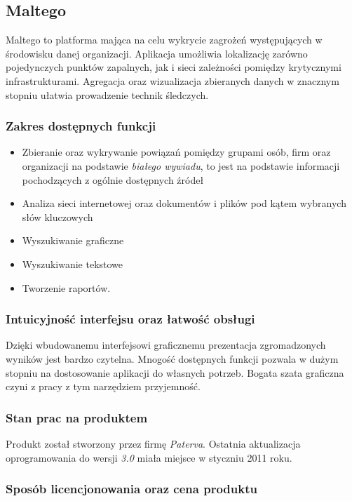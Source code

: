 \documentclass[11pt,a4paper]{article}
\begin{document}
\subsection{Maltego}

Maltego to platforma mająca na celu wykrycie zagrożeń występujących w środowisku danej organizacji. Aplikacja umożliwia lokalizację zarówno pojedynczych punktów zapalnych, jak i sieci zależności pomiędzy krytycznymi infrastrukturami. Agregacja oraz wizualizacja zbieranych danych w znacznym stopniu ułatwia prowadzenie technik śledczych. 

\subsubsection*{Zakres dostępnych funkcji}

\begin{itemize}
	\item Zbieranie oraz wykrywanie powiązań pomiędzy grupami osób, firm oraz organizacji na podstawie \textit{białego wywiadu}, to jest na podstawie informacji pochodzących z ogólnie dostępnych źródeł
	\item Analiza sieci internetowej oraz dokumentów i plików pod kątem wybranych słów kluczowych
	\item Wyszukiwanie graficzne
	\item Wyszukiwanie tekstowe
	\item Tworzenie raportów.
\end{itemize}

\subsubsection*{Intuicyjność interfejsu oraz łatwość obsługi}

Dzięki wbudowanemu interfejsowi graficznemu prezentacja zgromadzonych wyników jest bardzo czytelna. Mnogość dostępnych funkcji pozwala w dużym stopniu na dostosowanie aplikacji do własnych potrzeb. Bogata szata graficzna czyni z pracy z tym narzędziem przyjemność.

\subsubsection*{Stan prac na produktem}

Produkt został stworzony przez firmę \emph{Paterva}. Ostatnia aktualizacja oprogramowania do wersji \emph{3.0} miała miejsce w styczniu 2011 roku.

\subsubsection*{Sposób licencjonowania oraz cena produktu}
\end{document}
